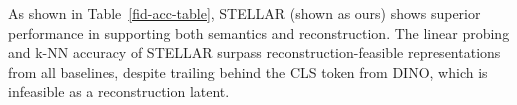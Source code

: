 As shown in Table~\ref{fid-acc-table}, STELLAR (shown as ours) shows superior performance in supporting both semantics and reconstruction. The linear probing and k-NN accuracy of STELLAR surpass reconstruction-feasible representations from all baselines, despite trailing behind the CLS token from DINO, which is infeasible as a reconstruction latent. 



